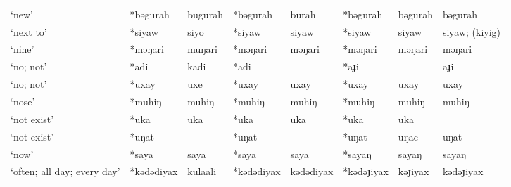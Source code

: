 \begin{landscape}
\begin{longtable}[c]{@{}p{3cm}<{\raggedright}p{2.75cm}<{\raggedright}p{2.75cm}<{\raggedright}p{2.75cm}<{\raggedright}p{2.75cm}<{\raggedright}p{2.75cm}<{\raggedright}p{2.75cm}<{\raggedright}p{2.75cm}<{\raggedright}@{}}
`new'                                                & *bəgurah           & bugurah                        & *bəgurah           & burah                      & *bəgurah         & bəgurah                  & bəgurah                           \\
`next to'                                            & *siyaw             & siyo                           & *siyaw             & siyaw                      & *siyaw           & siyaw                    & siyaw; (kiyig)                    \\
`nine'                                               & *məŋari            & muŋari                         & *məŋari            & məŋari                     & *məŋari          & məŋari                   & məŋari                            \\
`no; not'                                            & *adi               & kadi                           & *adi               &                            & *aɟi             &                          & aɟi                               \\
`no; not'                                            & *uxay              & uxe                            & *uxay              & uxay                       & *uxay            & uxay                     & uxay                              \\
`nose'                                               & *muhiŋ             & muhiŋ                          & *muhiŋ             & muhiŋ                      & *muhiŋ           & muhiŋ                    & muhiŋ                             \\
`not exist'                                          & *uka               & uka                            & *uka               & uka                        & *uka             & uka                      &                                   \\
`not exist'                                          & *uŋat              &                                & *uŋat              &                            & *uŋat            & uŋac                     & uŋat                              \\
`now'                                                & *saya              & saya                           & *saya              & saya                       & *sayaŋ           & sayaŋ                    & sayaŋ                             \\
`often; all day; every day'                          & *kədədiyax         & kulaali                        & *kədədiyax         & kədədiyax                  & *kədəɟiyax       & kəɟiyax                  & kədəɟiyax                         \\

\end{longtable}
\end{landscape}
